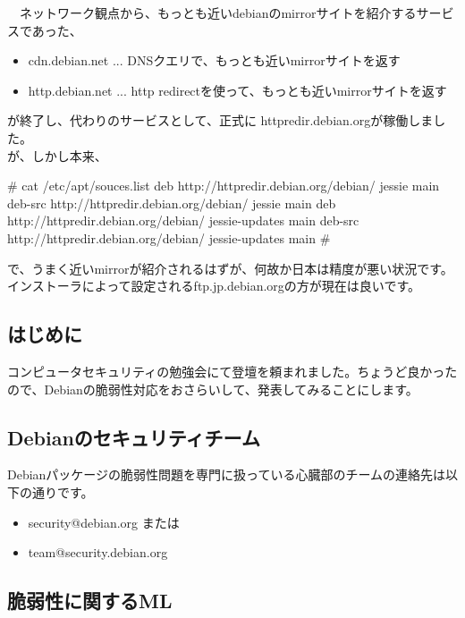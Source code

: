\documentclass[mingoth,a4paper]{jsarticle}
\begin{document}
　ネットワーク観点から、もっとも近いdebianのmirrorサイトを紹介するサービスであった、
\begin{itemize}
  \item cdn.debian.net ... DNSクエリで、もっとも近いmirrorサイトを返す
  \item http.debian.net ... http redirectを使って、もっとも近いmirrorサイトを返す
\end{itemize}
が終了し、代わりのサービスとして、正式に httpredir.debian.orgが稼働しました。
\\
  が、しかし本来、
  \begin{commandline}
# cat /etc/apt/souces.list
deb http://httpredir.debian.org/debian/ jessie main
deb-src http://httpredir.debian.org/debian/ jessie main
deb http://httpredir.debian.org/debian/ jessie-updates main
deb-src http://httpredir.debian.org/debian/ jessie-updates main
#
  \end{commandline}
で、うまく近いmirrorが紹介されるはずが、何故か日本は精度が悪い状況です。インストーラによって設定されるftp.jp.debian.orgの方が現在は良いです。


\subsection{はじめに}

 コンピュータセキュリティの勉強会にて登壇を頼まれました。ちょうど良かったので、Debianの脆弱性対応をおさらいして、発表してみることにします。

\subsection{Debianのセキュリティチーム}

 Debianパッケージの脆弱性問題を専門に扱っている心臓部のチームの連絡先は以下の通りです。

\begin{itemize}
\item security@debian.org または 
\item team@security.debian.org
\end{itemize}

\subsection{脆弱性に関するML}
\end{document}

